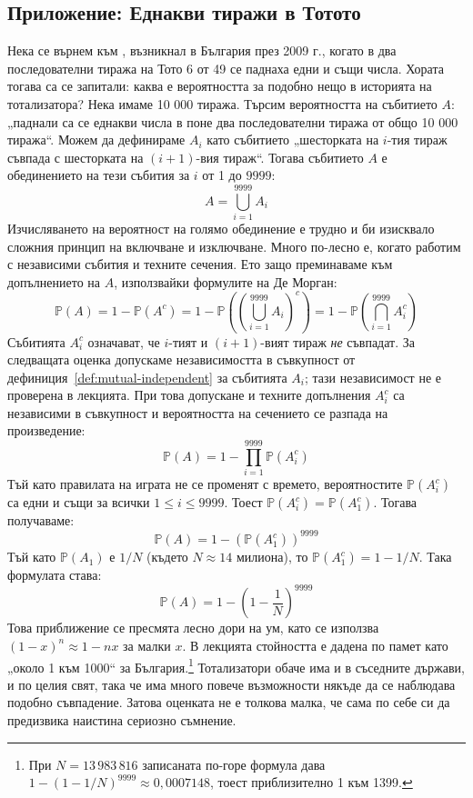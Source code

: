 \subsection{Приложение: Еднакви тиражи в Тотото}

Нека се върнем към , възникнал в България през 2009 г., когато в два последователни тиража на Тото 6 от 49 се паднаха едни и същи числа. Хората тогава са се запитали: каква е вероятността за подобно нещо в историята на тотализатора?
Нека имаме 10 000 тиража. Търсим вероятността на събитието $A$: „паднали са се еднакви числа в поне два последователни тиража от общо 10 000 тиража“.
Можем да дефинираме $A_i$ като събитието „шесторката на $i$-тия тираж съвпада с шесторката на $(i+1)$-вия тираж“.
Тогава събитието $A$ е обединението на тези събития за $i$ от 1 до $9999$:
\[
A = \bigcup_{i=1}^{9999} A_i
\]
Изчисляването на вероятност на голямо обединение е трудно и би изисквало сложния принцип на включване и изключване. Много по-лесно е, когато работим с независими събития и техните сечения. Ето защо преминаваме към допълнението на $A$, използвайки формулите на Де Морган:
\[
\mathbb{P}(A) = 1 - \mathbb{P}(A^c) = 1 - \mathbb{P}\left(\left(\bigcup_{i=1}^{9999} A_i\right)^c\right) = 1 - \mathbb{P}\left(\bigcap_{i=1}^{9999} A_i^c\right)
\]
Събитията $A_i^c$ означават, че $i$-тият и $(i+1)$-вият тираж \emph{не} съвпадат. За следващата оценка допускаме независимостта в съвкупност от дефиниция~\ref{def:mutual-independent} за събитията $A_i$; тази независимост не е проверена в лекцията. При това допускане и техните допълнения $A_i^c$ са независими в съвкупност и вероятността на сечението се разпада на произведение:
\[
\mathbb{P}(A) = 1 - \prod_{i=1}^{9999} \mathbb{P}(A_i^c)
\]
Тъй като правилата на играта не се променят с времето, вероятностите $\mathbb{P}(A_i^c)$ са едни и същи за всички $1 \le i \le 9999$. Тоест $\mathbb{P}(A_i^c) = \mathbb{P}(A_1^c)$. Тогава получаваме:
\[
\mathbb{P}(A) = 1 - (\mathbb{P}(A_1^c))^{9999}
\]
Тъй като $\mathbb{P}(A_1)$ е $1 / N$ (където $N \approx 14$ милиона), то $\mathbb{P}(A_1^c) = 1 - 1/N$. Така формулата става:
\[
\mathbb{P}(A) = 1 - \left(1 - \frac{1}{N}\right)^{9999}
\]
Това приближение се пресмята лесно дори на ум, като се използва $(1-x)^n \approx 1-nx$ за малки $x$. В лекцията стойността е дадена по памет като „около 1 към 1000“ за България.\footnote{При $N=13\,983\,816$ записаната по-горе формула дава $1-(1-1/N)^{9999}\approx 0{,}0007148$, тоест приблизително 1 към 1399.} Тотализатори обаче има и в съседните държави, и по целия свят, така че има много повече възможности някъде да се наблюдава подобно съвпадение. Затова оценката не е толкова малка, че сама по себе си да предизвика наистина сериозно съмнение.


